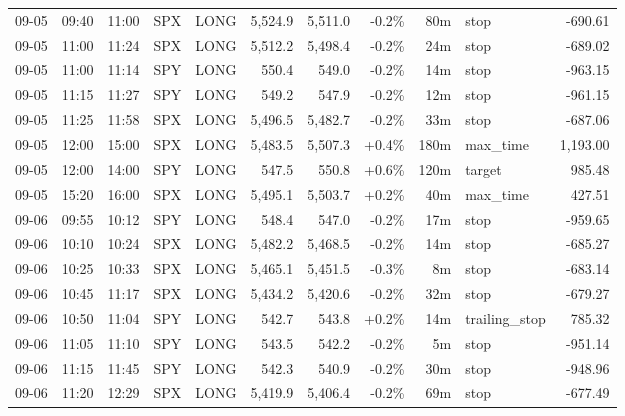 \documentclass[11pt,a4paper,twoside]{article}
\begin{document}
\begin{center}
\begin{longtable}{>{\color{txtmain}}l l l l l r r r r >{\color{txtmain}}l r}
09-05 & 09:40 & 11:00 & SPX & LONG & 5,524.9 & 5,511.0 & \textcolor{lossred}{-0.2\%} & 80m & stop & \textcolor{lossred}{-690.61} \\
09-05 & 11:00 & 11:24 & SPX & LONG & 5,512.2 & 5,498.4 & \textcolor{lossred}{-0.2\%} & 24m & stop & \textcolor{lossred}{-689.02} \\
09-05 & 11:00 & 11:14 & SPY & LONG & 550.4 & 549.0 & \textcolor{lossred}{-0.2\%} & 14m & stop & \textcolor{lossred}{-963.15} \\
09-05 & 11:15 & 11:27 & SPY & LONG & 549.2 & 547.9 & \textcolor{lossred}{-0.2\%} & 12m & stop & \textcolor{lossred}{-961.15} \\
09-05 & 11:25 & 11:58 & SPX & LONG & 5,496.5 & 5,482.7 & \textcolor{lossred}{-0.2\%} & 33m & stop & \textcolor{lossred}{-687.06} \\
09-05 & 12:00 & 15:00 & SPX & LONG & 5,483.5 & 5,507.3 & \textcolor{wingreen}{+0.4\%} & 180m & max\_time & \textcolor{wingreen}{1,193.00} \\
09-05 & 12:00 & 14:00 & SPY & LONG & 547.5 & 550.8 & \textcolor{wingreen}{+0.6\%} & 120m & target & \textcolor{wingreen}{985.48} \\
09-05 & 15:20 & 16:00 & SPX & LONG & 5,495.1 & 5,503.7 & \textcolor{wingreen}{+0.2\%} & 40m & max\_time & \textcolor{wingreen}{427.51} \\
09-06 & 09:55 & 10:12 & SPY & LONG & 548.4 & 547.0 & \textcolor{lossred}{-0.2\%} & 17m & stop & \textcolor{lossred}{-959.65} \\
09-06 & 10:10 & 10:24 & SPX & LONG & 5,482.2 & 5,468.5 & \textcolor{lossred}{-0.2\%} & 14m & stop & \textcolor{lossred}{-685.27} \\
09-06 & 10:25 & 10:33 & SPX & LONG & 5,465.1 & 5,451.5 & \textcolor{lossred}{-0.3\%} & 8m & stop & \textcolor{lossred}{-683.14} \\
09-06 & 10:45 & 11:17 & SPX & LONG & 5,434.2 & 5,420.6 & \textcolor{lossred}{-0.2\%} & 32m & stop & \textcolor{lossred}{-679.27} \\
09-06 & 10:50 & 11:04 & SPY & LONG & 542.7 & 543.8 & \textcolor{wingreen}{+0.2\%} & 14m & trailing\_stop & \textcolor{wingreen}{785.32} \\
09-06 & 11:05 & 11:10 & SPY & LONG & 543.5 & 542.2 & \textcolor{lossred}{-0.2\%} & 5m & stop & \textcolor{lossred}{-951.14} \\
09-06 & 11:15 & 11:45 & SPY & LONG & 542.3 & 540.9 & \textcolor{lossred}{-0.2\%} & 30m & stop & \textcolor{lossred}{-948.96} \\
09-06 & 11:20 & 12:29 & SPX & LONG & 5,419.9 & 5,406.4 & \textcolor{lossred}{-0.2\%} & 69m & stop & \textcolor{lossred}{-677.49} \\

\end{longtable}
\end{center}
\end{document}
